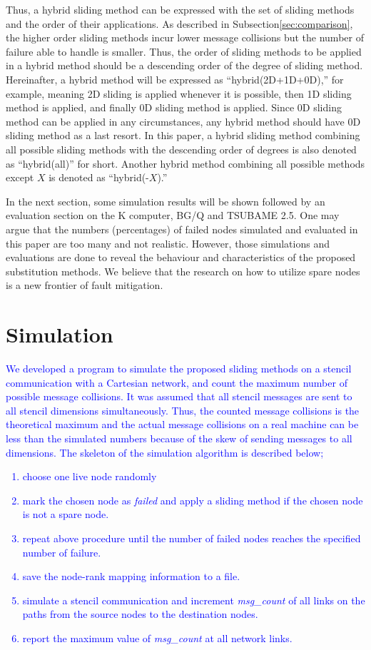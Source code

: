 \documentclass[Afour,times,sagev]{sagej}
\newcommand{\AH}[1]{%
  \textcolor{blue}{#1}}%
\begin{document}
Thus, a hybrid sliding method can be expressed with the set of sliding 
methods and the order of their applications. As described in
Subsection\ref{sec:comparison}, the higher order sliding methods incur
lower message collisions but the number of failure able to
handle is smaller. Thus, the order of sliding methods to be applied in
a hybrid method should be a descending order of the degree of sliding
method. Hereinafter, a hybrid method will be expressed as
``hybrid(2D+1D+0D),'' for example, meaning 2D sliding is applied
whenever it is possible, then 1D sliding method is applied, and
finally 0D sliding method is applied. Since 0D sliding method can be
applied in any circumstances, any hybrid method should have 0D sliding  
method as a last resort. In this paper, a hybrid sliding method
combining all possible sliding methods with the descending order of
degrees is also denoted as ``hybrid(all)'' for short. Another hybrid
method combining all possible methods except $X$ is denoted as
``hybrid(-$X$).''  

In the next section, some simulation results will be shown followed by
an evaluation section on the K computer, BG/Q and TSUBAME
2.5\cite{tsubame}. One may 
argue that the numbers (percentages) of failed nodes simulated and
evaluated in this paper are too many and not realistic. However,
those simulations and evaluations are done to reveal the behaviour and 
characteristics of the proposed substitution methods. We believe that
the research on how to utilize spare nodes is a new frontier of fault
mitigation. 

\section{Simulation}\label{sec:sim}

\AH{
 We developed a program to simulate the proposed sliding methods on a
stencil communication with a Cartesian network, and count the maximum
number of possible message collisions. It was assumed that all stencil
messages are sent to all stencil dimensions simultaneously. Thus, the
counted message collisions is the theoretical maximum and the actual
message collisions on a real machine can be less than the simulated
numbers because of the skew of sending messages to all dimensions. The
skeleton of the simulation algorithm is described below;}

\AH{
\begin{enumerate}
\item choose one live node randomly
\item mark the chosen node as {\it failed} and apply a sliding
  method if the chosen node is not a spare node.
\item repeat above procedure until the number of failed nodes reaches
  the specified number of failure.
\item save the node-rank mapping information to a file.
\item simulate a stencil communication and increment {\it
    msg\_count} of all links on the paths from the source nodes to the
  destination nodes. 
\item report the maximum value of {\it msg\_count} at all network links.
\end{enumerate}
}
\end{document}
